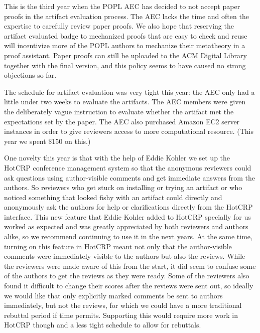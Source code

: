 This is the third year when the POPL AEC has decided to not accept paper proofs
in the artifact evaluation process. The AEC lacks the time and often the
expertise to carefully review paper proofs. We also hope that reserving the
artifact evaluated badge to mechanized proofs that are easy to check and reuse
will incentivize more of the POPL authors to mechanize their metatheory in a
proof assistant. Paper proofs can still be uploaded to the ACM Digital Library
together with the final version, and this policy seems to have caused no strong
objections so far.

The schedule for artifact evaluation was very tight this year: the AEC only had
a little under two weeks to evaluate the artifacts. The AEC members were given
the deliberately vague instruction to evaluate whether the artifact met the
expectations set by the paper. The AEC also purchased Amazon EC2 server
instances in order to give reviewers access to more computational resource.
(This year we spent \$150 on this.)

One novelty this year is that with the help of Eddie Kohler we set up the HotCRP
conference management system so that the anonymous reviewers could ask questions
using author-visible comments and get immediate answers from the authors. So
reviewers who get stuck on installing or trying an artifact or who noticed
something that looked fishy with an artifact could directly and anonymously ask
the authors for help or clarifications directly from the HotCRP interface. This
new feature that Eddie Kohler added to HotCRP specially for us worked as
expected and was greatly appreciated by both reviewers and authors alike, so we
recommend continuing to use it in the next years. At the same time, turning on
this feature in HotCRP meant not only that the author-visible comments were
immediately visible to the authors but also the reviews. While the reviewers
were made aware of this from the start, it did seem to confuse some of the
authors to get the reviews as they were ready. Some of the reviewers also found
it difficult to change their scores after the reviews were sent out, so ideally
we would like that only explicitly marked comments be sent to authors
immediately, but not the reviews, for which we could have a more traditional
rebuttal period if time permits. Supporting this would require more work in
HotCRP though and a less tight schedule to allow for rebuttals.

